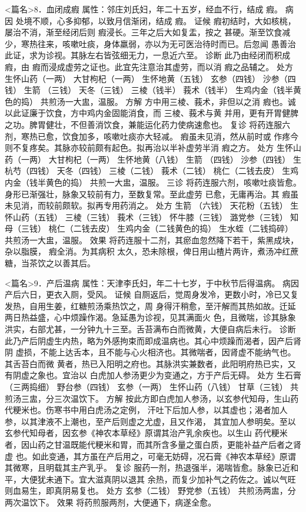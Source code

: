 \documentclass[a4paper,12pt,UTF8,twoside]{ctexbook}
\begin{document}
<篇名>8．血闭成瘕
属性：邻庄刘氏妇，年二十五岁，经血不行，结成 瘕。 
病因 处境不顺，心多抑郁，以致月信渐闭，结成 瘕。 
证候 瘕初结时，大如核桃，屡治不消，渐至经闭后则 瘕浸长。三年之后大如复盂，按之 
甚硬。渐至饮食减少，寒热往来，咳嗽吐痰，身体羸弱，亦以为无可医治待时而已。后忽闻 
愚善治此证，求为诊视。其脉左右皆弦细无力，一息近六至。 
诊断 此乃由经闭而积成 瘕，由 瘕而浸成虚劳之证也。此宜先注意治其虚劳，而以消 瘕之品辅之。 
处方 生怀山药（一两） 大甘枸杞（一两） 生怀地黄（五钱） 玄参（四钱） 
沙参（四钱） 生箭 （三钱） 天冬（三钱） 三棱（钱半） 
莪术（钱半） 生鸡内金（钱半黄色的捣） 
共煎汤一大盅，温服。 
方解 方中用三棱、莪术，非但以之消 瘕也。诚以此证廉于饮食，方中鸡内金固能消食，而 
三棱、莪术与黄 并用，更有开胃健脾之功。脾胃健壮，不但善消饮食，兼能运化药力使病速愈也。 
复诊 将药连服六剂，寒热已愈，饮食加多，咳嗽吐痰亦大轻减。 瘕虽未见消，然从前时或 
作疼今则不复疼矣。其脉亦较前颇有起色。拟再治以半补虚劳半消 瘕之方。 
处方 生怀山药（一两） 大甘枸杞（一两） 生怀地黄（八钱） 生箭 （四钱） 
沙参（四钱） 生杭芍（四钱） 天冬（四钱） 三棱（二钱） 
莪术（二钱） 桃仁（二钱去皮） 生鸡内金（钱半黄色的捣） 
共煎一大盅，温服。 
三诊 将药连服六剂，咳嗽吐痰皆愈。身形已渐强壮，脉象又较前有力，至数复常。至此虚劳 
已愈，无庸再治。其 瘕虽未见消，而较前颇软。拟再专用药消之。 
处方 生箭 （六钱） 天花粉（五钱） 生怀山药（五钱） 三棱（三钱） 
莪术（三钱） 怀牛膝（三钱） 潞党参（三钱） 知母（三钱） 
桃仁（二钱去皮） 生鸡内金（二钱黄色的捣） 生水蛭（二钱捣碎） 
共煎汤一大盅，温服。 
效果 将药连服十二剂，其瘀血忽然降下若干，紫黑成块，杂以脂膜， 瘕全消。为其病积 
太久，恐未除根，俾日用山楂片两许，煮汤冲红蔗糖，当茶饮之以善其后。 


<篇名>9．产后温病
属性：天津李氏妇，年二十七岁，于中秋节后得温病。 
病因 产后六日，更衣入厕，受风。 
证候 自厕返后，觉周身发冷，更数小时，冷已又复发热，自用生姜，红糖煎汤乘热饮之，周 
身得汗稍愈，至汗解而其热如故。迁延两日热益盛，心中烦躁作渴。急延愚为诊视，见其满面火 
色，且微喘，诊其脉象洪实，右部尤甚，一分钟九十三至。舌苔满布白而微黄，大便自病后未行。 
诊断 此乃产后阴虚生内热，略为外感拘束而即成温病也。其心中烦躁而渴者，因产后肾阴 
虚损，不能上达舌本，且不能与心火相济也。其微喘者，因肾虚不能纳气也。其舌苔白而微 
黄者，热已入阳明之府也。其脉洪实兼数者，此阳明府热已实，又有阴虚之象也。宜治以 
白虎加人参汤更少为变通之，方于产后无碍。 
处方 生石膏（三两捣细） 野台参（四钱） 玄参（一两） 生怀山药（八钱） 甘草（三钱） 
共煎汤三盅，分三次温饮下。 
方解 按此方即白虎加人参汤，以玄参代知母，生山药代粳米也。伤寒书中用白虎汤之定例， 
汗吐下后加人参，以其虚也；渴者加人参，以其津液不上潮也，至产后则虚之尤虚，且又作渴， 
其宜加人参明矣。至以玄参代知母者，因玄参《神农本草经》原谓其治产乳余疾也。以生山 
药代粳米者，因山药之甘温既能代粳米和胃，而其所含多量之蛋白质，更能补益产后者之肾虚 
也。如此变通，其方虽在产后用之，可毫无妨碍，况石膏《神农本草经》原谓其微寒，且明载其主产乳乎。 
复诊 服药一剂，热退强半，渴喘皆愈。脉象已近和平，大便犹未通下。宜大滋真阴以退其 
余热，而复少加补气之药佐之。诚以气旺则血易生，即真阴易复也。 
处方 玄参（二钱） 野党参（五钱） 
共煎汤两盅，分两次温饮下。 
效果 将药煎服两剂，大便通下，病遂全愈。 
\end{document}

